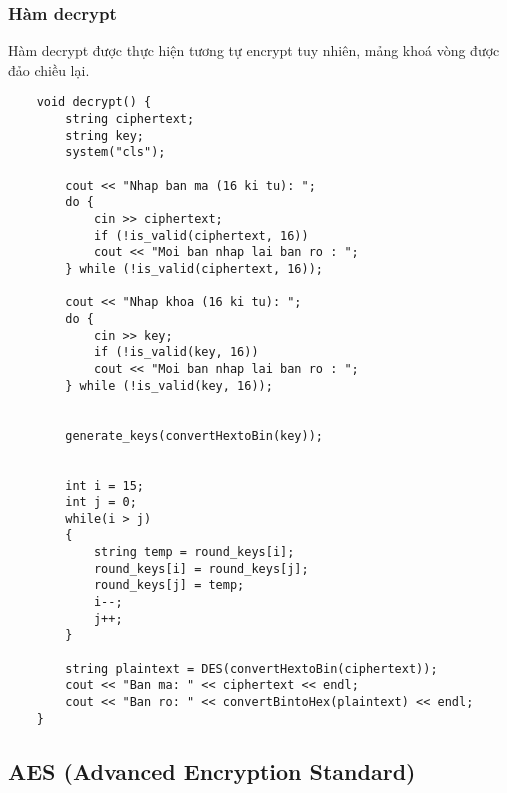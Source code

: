 \subsubsection{Hàm decrypt}
Hàm decrypt được thực hiện tương tự encrypt tuy nhiên, mảng khoá vòng được đảo chiều lại.
\begin{verbatim}
	void decrypt() {
		string ciphertext;
		string key;
		system("cls");
		
		cout << "Nhap ban ma (16 ki tu): ";
		do {
			cin >> ciphertext;
			if (!is_valid(ciphertext, 16))
			cout << "Moi ban nhap lai ban ro : ";
		} while (!is_valid(ciphertext, 16));
		
		cout << "Nhap khoa (16 ki tu): ";
		do {
			cin >> key;
			if (!is_valid(key, 16))
			cout << "Moi ban nhap lai ban ro : ";
		} while (!is_valid(key, 16));
		
		
		generate_keys(convertHextoBin(key));
		
		
		int i = 15;
		int j = 0;
		while(i > j)
		{
			string temp = round_keys[i];
			round_keys[i] = round_keys[j];
			round_keys[j] = temp;
			i--;
			j++;
		}
		
		string plaintext = DES(convertHextoBin(ciphertext));
		cout << "Ban ma: " << ciphertext << endl;
		cout << "Ban ro: " << convertBintoHex(plaintext) << endl;
	} 
\end{verbatim}
\subsection{AES (Advanced Encryption Standard)}
